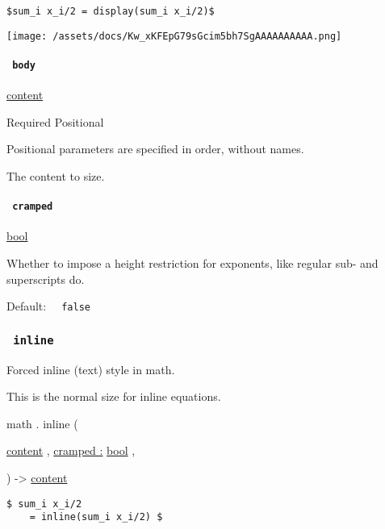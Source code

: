 \begin{verbatim}
$sum_i x_i/2 = display(sum_i x_i/2)$
\end{verbatim}

\texttt{[image: /assets/docs/Kw\_xKFEpG79sGcim5bh7SgAAAAAAAAAA.png]}

\paragraph{\texorpdfstring{\texttt{\ body\ }}{ body }}\label{functions-display-body}

\href{/docs/reference/foundations/content/}{content}

{Required} {{ Positional }}

\label{functions-display-body-positional-tooltip}
Positional parameters are specified in order, without names.

The content to size.

\paragraph{\texorpdfstring{\texttt{\ cramped\ }}{ cramped }}\label{functions-display-cramped}

\href{/docs/reference/foundations/bool/}{bool}

Whether to impose a height restriction for exponents, like regular sub-
and superscripts do.

Default: \texttt{\ }{\texttt{\ false\ }}\texttt{\ }

\subsubsection{\texorpdfstring{\texttt{\ inline\ }}{ inline }}\label{functions-inline}

Forced inline (text) style in math.

This is the normal size for inline equations.

math { . } { inline } (

{ \href{/docs/reference/foundations/content/}{content} , } {
\hyperref[functions-inline-parameters-cramped]{cramped :}
\href{/docs/reference/foundations/bool/}{bool} , }

) -\textgreater{} \href{/docs/reference/foundations/content/}{content}

\begin{verbatim}
$ sum_i x_i/2
    = inline(sum_i x_i/2) $
\end{verbatim}

